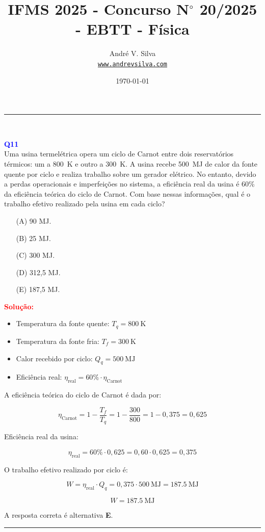 \documentclass[a4paper,12pt]{article}
\title{ \textbf{\large IFMS 2025 - Concurso N$^{\circ}$ 20/2025 - EBTT - F\'isica}}
\author{Andr\'e V. Silva \\ \texttt{\url{www.andrevsilva.com}}}
\date{\today}
\begin{document}
\maketitle
\noindent\rule{\linewidth}{0.4pt}\\

\justifying

\begin{flushleft}
\textbf{\textcolor{blue}{\Large Q11}}\\
\noindent
Uma usina termelétrica opera um \colorbox{yellow!50}{ciclo de Carnot} entre dois reservatórios térmicos: um a 
\SI{800}{\kelvin} e outro a \SI{300}{\kelvin}. A usina recebe \SI{500}{\mega\joule} de calor da 
fonte quente por ciclo e realiza trabalho sobre um gerador elétrico. No entanto, devido a perdas 
operacionais e imperfeições no sistema, a eficiência real da usina é 60\% da eficiência teórica do ciclo 
de Carnot. Com base nessas informações, qual é o trabalho efetivo realizado pela usina em cada ciclo?

\begin{itemize}
\item[(A)] 90 MJ.
\item[(B)] 25 MJ.
\item[(C)] 300 MJ.
\item[(D)] 312,5 MJ.
\item[(E)] 187,5 MJ.
\end{itemize}

\vspace{0.5cm}

\textcolor{red}{\textbf{Solução:}}\\

\begin{itemize}
    \item Temperatura da fonte quente: \( T_q = \SI{800}{\kelvin} \)
    \item Temperatura da fonte fria: \( T_f = \SI{300}{\kelvin} \)
    \item Calor recebido por ciclo: \( Q_q = \SI{500}{\mega\joule} \)
    \item Eficiência real: \( \eta_{\text{real}} = 60\% \cdot \eta_{\text{Carnot}} \)
\end{itemize}

\vspace{1em}
A eficiência teórica do ciclo de Carnot é dada por:

\[
\eta_{\text{Carnot}} = 1 - \frac{T_f}{T_q} = 1 - \frac{300}{800} = 1 - 0{,}375 = 0{,}625
\]

Eficiência real da usina:

\[
\eta_{\text{real}} = 60\% \cdot 0{,}625 = 0{,}60 \cdot 0{,}625 = 0{,}375
\]

O trabalho efetivo realizado por ciclo é:

\[
W = \eta_{\text{real}} \cdot Q_q = 0{,}375 \cdot \SI{500}{\mega\joule} = \SI{187.5}{\mega\joule}
\]

\[
\boxed{W = \SI{187.5}{\mega\joule}}
\]

A resposta correta é alternativa \colorbox{green!50}{\textbf{E}}.

\end{flushleft}
\noindent\rule{\linewidth}{0.6pt}\\
\end{document}
